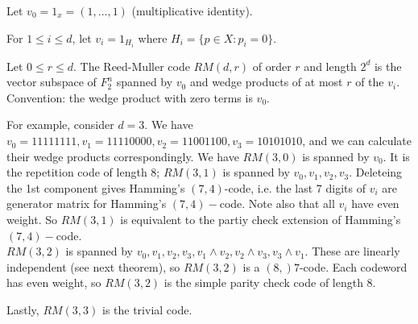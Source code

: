\documentclass[a4paper]{article}
\begin{document}
Let $v_0 = 1_x = (1,...,1)$ (multiplicative identity).

For $1 \leq i \leq d$, let $v_i = 1_{H_i}$ where $H_i = \{p \in X: p_i = 0\}$.

\begin{defi}
Let $0 \leq r \leq d$. The Reed-Muller code $RM(d,r)$ of order $r$ and length $2^d$ is the vector subspace of $F_2^n$ spanned by $v_0$ and wedge products of at most $r$ of the $v_i$.\\
Convention: the wedge product with zero terms is $v_0$.
\end{defi}

For example, consider $d=3$. We have $v_0 = 11111111,v_1 = 11110000,v_2=11001100,v_3 = 10101010$, and we can calculate their wedge products correspondingly. We have $RM(3,0)$ is spanned by $v_0$. It is the repetition code of length 8; $RM(3,1)$ is spanned by $v_0,v_1,v_2,v_3$. Deleteing the 1st component gives Hamming's $(7,4)$-code, i.e. the last 7 digits of $v_i$ are generator matrix for Hamming's $(7,4)-$code. Note also that all $v_i$ have even weight. So $RM(3,1)$ is equivalent to the partiy check extension of Hamming's $(7,4)-$code.\\

$RM(3,2)$ is spanned by $v_0,v_1,v_2,v_3,v_1 \wedge v_2,v_2 \wedge v_3,v_3 \wedge v_1$. These are linearly independent (see next theorem), so $RM(3,2)$ is a $(8,)7$-code. Each codeword has even weight, so $RM(3,2)$ is the simple parity check code of length $8$.

Lastly, $RM(3,3)$ is the trivial code.
\end{document}
